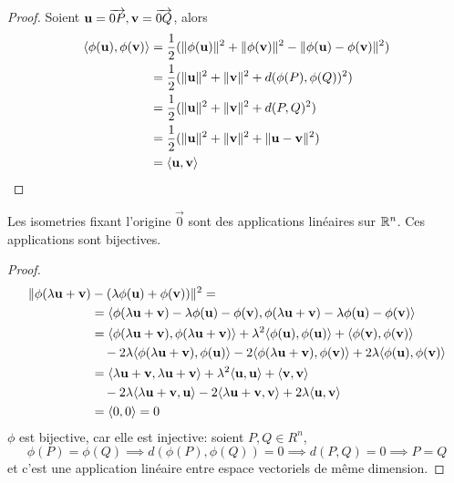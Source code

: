 \begin{proof}
	Soient $\mathbf{u} = \overrightarrow{0P}, \mathbf{v} = \overrightarrow{0Q}$, alors
	\begin{align*}
		\langle \phi(\mathbf{u}), \phi(\mathbf{v}) \rangle &= \frac{1}{2}(\|\phi(\mathbf{u})\|^2 +	
		\|\phi(\mathbf{v})\|^2 - \| \phi(\mathbf{u}) - \phi(\mathbf{v}) \|^2)\\
		&= \frac{1}{2}(\| \mathbf{u} \|^2 + \| \mathbf{v} \|^2 + d(\phi(P), \phi(Q))^2)\\
		&= \frac{1}{2}(\| \mathbf{u} \|^2 + \| \mathbf{v} \|^2 + d(P, Q)^2)\\
		&= \frac{1}{2}(\| \mathbf{u} \|^2 + \| \mathbf{v} \|^2
			+ \|\mathbf{u} - \mathbf{v}\|^2)\\
		&= \langle \mathbf{u}, \mathbf{v} \rangle
	\end{align*}
\end{proof}

\begin{theorem}
	Les isometries fixant l'origine $\vec{0}$ sont des applications linéaires sur
	$\mathbb{R}^n$. Ces applications sont bijectives.
\end{theorem}

\begin{proof}
	\begin{align*}
		\| \phi(\lambda \mathbf{u} + \mathbf{v})
		&- (\lambda \phi(\mathbf{u}) + \phi(\mathbf{v}))\|^2 =\\
		&= \langle \phi(\lambda \mathbf{u} + \mathbf{v})
		- \lambda \phi(\mathbf{u}) - \phi(\mathbf{v}), \phi(\lambda \mathbf{u} + \mathbf{v})
		- \lambda \phi(\mathbf{u}) - \phi(\mathbf{v}) \rangle
		\\
		&= \langle \phi(\lambda \mathbf{u} + \mathbf{v}), \phi(\lambda \mathbf{u} + \mathbf{v}) \rangle
		+ \lambda^2 \langle \phi(\mathbf{u}), \phi(\mathbf{u}) \rangle
		+ \langle \phi(\mathbf{v}), \phi(\mathbf{v}) \rangle\\
		&\quad- 2\lambda\langle \phi(\lambda\mathbf{u} + \mathbf{v}), \phi(\mathbf{u}) \rangle
		- 2\langle \phi(\lambda\mathbf{u} + \mathbf{v}), \phi(\mathbf{v}) \rangle
		+ 2\lambda\langle \phi(\mathbf{u}), \phi(\mathbf{v}) \rangle
		\\
		&= \langle \lambda \mathbf{u} + \mathbf{v}, \lambda \mathbf{u} + \mathbf{v} \rangle
		+ \lambda^2 \langle \mathbf{u}, \mathbf{u} \rangle
		+ \langle \mathbf{v}, \mathbf{v} \rangle\\
		&\quad- 2\lambda\langle \lambda\mathbf{u} + \mathbf{v}, \mathbf{u} \rangle
		- 2\langle \lambda\mathbf{u} + \mathbf{v}, \mathbf{v} \rangle
		+ 2\lambda\langle \mathbf{u}, \mathbf{v} \rangle
		\\
		&= \langle 0, 0 \rangle = 0
	\end{align*}
	$\phi$ est bijective, car elle est injective: soient $P, Q \in R^n$,
	\begin{equation*}
		\phi(P) = \phi(Q) \implies d(\phi(P), \phi(Q)) = 0 \implies
		d(P, Q) = 0 \implies P = Q
	\end{equation*}
	et c'est une application linéaire entre espace vectoriels de même dimension.
\end{proof}

